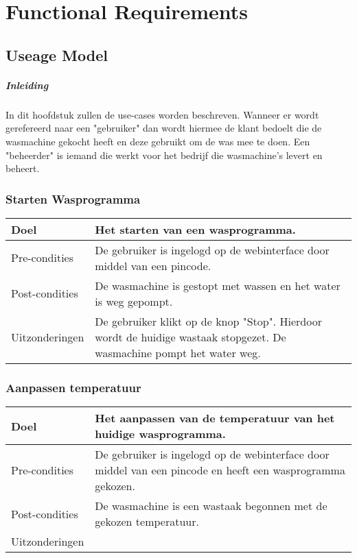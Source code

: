 \chapter{Functional Requirements}
\section{Useage Model}

\paragraph{Inleiding}
In dit hoofdstuk zullen de use-cases worden beschreven.
Wanneer er wordt gerefereerd naar een "gebruiker" dan wordt hiermee de klant bedoelt die de wasmachine gekocht heeft en deze gebruikt om de was mee te doen.
Een "beheerder" is iemand die werkt voor het bedrijf die wasmachine's levert en beheert.

\subsection{Starten Wasprogramma}
\begin{center}
  \begin{tabular}{ | p{4cm} | p{8.5cm} | }    \hline
    Doel & Het starten van een wasprogramma. \\ \hline
    Pre-condities & De gebruiker is ingelogd op de webinterface door middel van een pincode. \\ \hline
    Post-condities & De wasmachine is gestopt met wassen en het water is weg gepompt. \\ \hline
    Uitzonderingen & De gebruiker klikt op de knop "Stop". Hierdoor wordt de huidige wastaak stopgezet. De wasmachine pompt het water weg. \\
    \hline
  \end{tabular}
\end{center}

\subsection{Aanpassen temperatuur}
\begin{center}
  \begin{tabular}{ | p{4cm} | p{8.5cm} | }    \hline
    Doel & Het aanpassen van de temperatuur van het huidige wasprogramma. \\ \hline
    Pre-condities & De gebruiker is ingelogd op de webinterface door middel van een pincode en heeft een wasprogramma gekozen. \\ \hline
    Post-condities & De wasmachine is een wastaak begonnen met de gekozen temperatuur. \\ \hline
    Uitzonderingen &  \\
    \hline
  \end{tabular}
\end{center}

